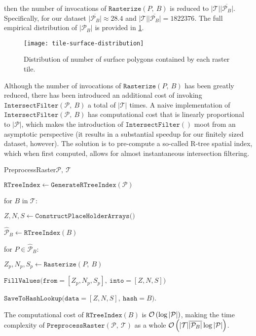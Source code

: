 %
then the number of invocations of $\texttt{Rasterize}(P,~B)$ is reduced to $|\mathcal{T}|\overline{|\mathcal{P}_B|}$.
Specifically, for our dataset $\overline{|\mathcal{P}_B|} \approx \num{28.4}$ and $|\mathcal{T}|\overline{|\mathcal{P}_B|} = \num{1822376}$.
The full empirical distribution of $|\mathcal{P}_B|$ is provided in \cref{fig:tile-surface-distribution}.
\begin{figure}
  \texttt{[image: tile-surface-distribution]}
  \caption{%
    Distribution of number of surface polygons contained by each raster tile.
  }%
  \label{fig:tile-surface-distribution}
\end{figure}
Although the number of invocations of $\texttt{Rasterize}(P,~B)$ has been greatly reduced, there has been introduced an additional cost of invoking $\texttt{IntersectFilter}(\mathcal{P},~B)$ a total of $|\mathcal{T}|$ times.
A naive implementation of $\texttt{IntersectFilter}(\mathcal{P},~B)$ has computational cost that is linearly proportional to $|\mathcal{P}|$, which makes the introduction of $\texttt{IntersectFilter}()$ moot from an asymptotic perspective (it results in a substantial speedup for our finitely sized dataset, however).
The solution is to pre-compute a so-called R-tree spatial index, which when first computed, allows for almost instantaneous intersection filtering\cite{rtree}.
\begin{pseudofunc}{PreprocessRaster}{$\mathcal{P},~\mathcal{T}$}
  \item $\texttt{RTreeIndex} \leftarrow \texttt{GenerateRTreeIndex}(\mathcal{P})$
  \item for $B$ in $\mathcal{T}$:
  \begin{pseudoloop}
    \item $Z, N, S \leftarrow \texttt{ConstructPlaceHolderArrays()}$
    \item $\hat{\mathcal{P}}_B \leftarrow \texttt{RTreeIndex}(B)$
    \item for $P \in \hat{\mathcal{P}}_B$:
    \begin{pseudoloop}
      \item $Z_p, N_p, S_p \leftarrow \texttt{Rasterize}(P,~B)$
      \item $\texttt{FillValues(from}=[Z_p, N_p, S_p],~\texttt{into}=[Z, N, S])$
    \end{pseudoloop}
    \item $\texttt{SaveToHashLookup(data}=[Z, N, S],~\texttt{hash}=B)$.
  \end{pseudoloop}
\end{pseudofunc}
The computational cost of $\texttt{RTreeIndex}(B)$ is $\mathcal{O}\left(\log{|\mathcal{P}|}\right)$, making the time complexity of $\texttt{PreprocessRaster}(\mathcal{P},~\mathcal{T})$ as a whole $\mathcal{O}\left(|\mathcal{T}| \overline{|\mathcal{P}_B|} \log{|\mathcal{P}|}\right)$.
